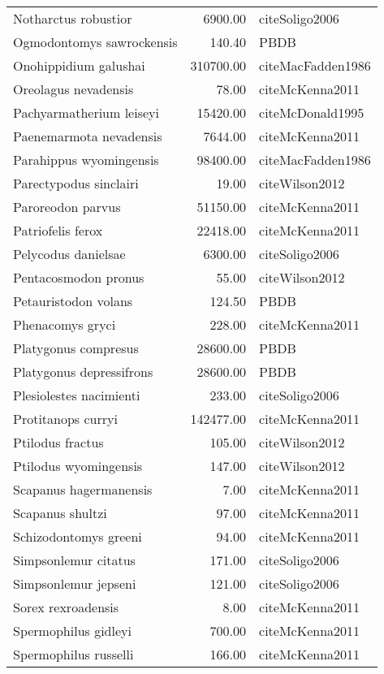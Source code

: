 \begin{table}[ht]
\begin{tabular}{lrl}
  Notharctus robustior & 6900.00 & cite{Soligo2006} \\ 
  Ogmodontomys sawrockensis & 140.40 & PBDB \\ 
  Onohippidium galushai & 310700.00 & cite{MacFadden1986} \\ 
  Oreolagus nevadensis & 78.00 & cite{McKenna2011} \\ 
  Pachyarmatherium leiseyi & 15420.00 & cite{McDonald1995} \\ 
  Paenemarmota nevadensis & 7644.00 & cite{McKenna2011} \\ 
  Parahippus wyomingensis & 98400.00 & cite{MacFadden1986} \\ 
  Parectypodus sinclairi & 19.00 & cite{Wilson2012} \\ 
  Paroreodon parvus & 51150.00 & cite{McKenna2011} \\ 
  Patriofelis ferox & 22418.00 & cite{McKenna2011} \\ 
  Pelycodus danielsae & 6300.00 & cite{Soligo2006} \\ 
  Pentacosmodon pronus & 55.00 & cite{Wilson2012} \\ 
  Petauristodon volans & 124.50 & PBDB \\ 
  Phenacomys gryci & 228.00 & cite{McKenna2011} \\ 
  Platygonus compresus & 28600.00 & PBDB \\ 
  Platygonus depressifrons & 28600.00 & PBDB \\ 
  Plesiolestes nacimienti & 233.00 & cite{Soligo2006} \\ 
  Protitanops curryi & 142477.00 & cite{McKenna2011} \\ 
  Ptilodus fractus & 105.00 & cite{Wilson2012} \\ 
  Ptilodus wyomingensis & 147.00 & cite{Wilson2012} \\ 
  Scapanus hagermanensis & 7.00 & cite{McKenna2011} \\ 
  Scapanus shultzi & 97.00 & cite{McKenna2011} \\ 
  Schizodontomys greeni & 94.00 & cite{McKenna2011} \\ 
  Simpsonlemur citatus & 171.00 & cite{Soligo2006} \\ 
  Simpsonlemur jepseni & 121.00 & cite{Soligo2006} \\ 
  Sorex rexroadensis & 8.00 & cite{McKenna2011} \\ 
  Spermophilus gidleyi & 700.00 & cite{McKenna2011} \\ 
  Spermophilus russelli & 166.00 & cite{McKenna2011} \\ 

\end{tabular}
\end{table}
